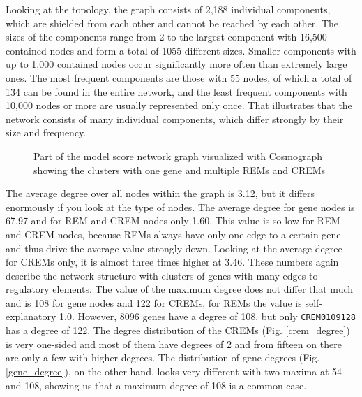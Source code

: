 \documentclass[pdftex,12pt,a4paper]{report}
\begin{document}
Looking at the topology, the graph consists of 2,188 individual components, which are shielded from each other and cannot be reached by each other. The sizes of the components range from 2 to the largest component with 16,500 contained nodes and form a total of 1055 different sizes. Smaller components with up to 1,000 contained nodes occur significantly more often than extremely large ones. The most frequent components are those with 55 nodes, of which a total of 134 can be found in the entire network, and the least frequent components with 10,000 nodes or more are usually represented only once. That illustrates that the network consists of many individual components, which differ strongly by their size and frequency.
\begin{figure}[!ht]
\begin{center}
	\caption{Part of the model score network graph visualized with Cosmograph\cite{cosmograph} showing the clusters with one gene and multiple REMs and CREMs}
	\label{network}
\end{center}
\end{figure}

The average degree over all nodes within the graph is 3.12, but it differs enormously if you look at the type of nodes. The average degree for gene nodes is 67.97 and for REM and CREM nodes only 1.60. This value is so low for REM and CREM nodes, because REMs always have only one edge to a certain gene and thus drive the average value strongly down. Looking at the average degree for CREMs only, it is almost three times higher at 3.46. These numbers again describe the network structure with clusters of genes with many edges to regulatory elements. The value of the maximum degree does not differ that much and is 108 for gene nodes and 122 for CREMs, for REMs the value is self-explanatory 1.0. However, 8096 genes have a degree of 108, but only \texttt{CREM0109128} has a degree of 122. 
The degree distribution of the CREMs (Fig. \ref{crem_degree}) is very one-sided and most of them have degrees of 2 and from fifteen on there are only a few with higher degrees. The distribution of gene degrees (Fig. \ref{gene_degree}), on the other hand, looks very different with two maxima at 54 and 108, showing us that a maximum degree of 108 is a common case. 
\end{document}
